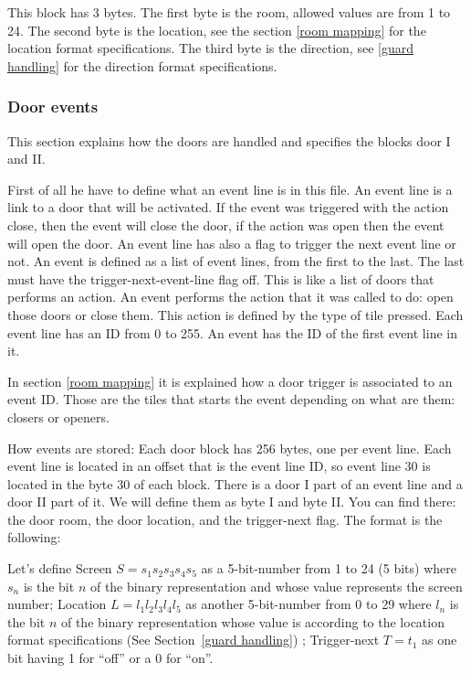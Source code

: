 \documentclass{article}
\begin{document}
 This block has 3 bytes.
 The first byte is the  room, allowed values are from 1 to 24.
 The second byte is the  location, see the section \ref{room mapping} for the location
 format specifications.
 The third byte is the  direction, see \ref{guard handling} for the direction format
 specifications.

\subsubsection{Door events\label{door events}} %
 This section explains how the doors are handled and specifies the blocks
 door I and II.

 First of all he have to define what an event line is in this file. An
 event line is a link to a door that will be activated. If the event was
 triggered with the action close, then the event will close the door, if
 the action was open then the event will open the door. An event line has
 also a flag to  trigger the next event line or not.
 An event is defined as a list of event lines, from the first to the last.
 The last must have the trigger-next-event-line flag off. This is like a
 list of doors that performs an action.
 An event performs the action that it was called to do: open those doors or
 close them. This action is defined by the type of tile pressed.
 Each event line has an ID from 0 to 255. An event has the ID of the first
 event line in it.

 In section \ref{room mapping} it is explained how a door trigger is associated to an
 event ID. Those are the tiles that starts the event depending on what are
 them: closers or openers.

 How events are stored:
 Each door block has 256 bytes, one per event line. Each event line is
 located in an offset that is the event line ID, so event line 30 is
 located in the byte 30 of each block.
 There is a door I part of an event line and a door II part of it. We will
 define them as byte I and byte II.
 You can find there: the door room, the door location, and the
 trigger-next flag. The format is the following:

 Let's define
  Screen $S = s_1 s_2 s_3 s_4 s_5$ as a 5-bit-number from 1 to 24 (5 bits) where $s_n$ is the bit $n$ of the binary representation and whose value represents the screen   number;
  Location $L = l_1 l_2 l_3 l_4 l_5$ as another 5-bit-number from 0 to 29 where $l_n$ is the bit $n$ of the binary representation whose value is according to the location format specifications (See Section~\ref{guard handling}) ;
  Trigger-next $T = t_1$ as one bit having 1 for ``off'' or a 0 for ``on''.\\
\end{document}
